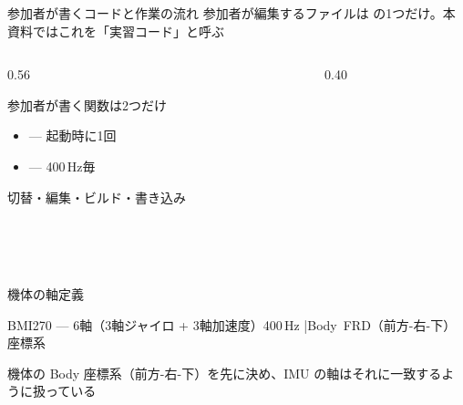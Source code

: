 \begin{frame}[fragile]{参加者が書くコードと作業の流れ}
  {\small 参加者が編集するファイルは  の1つだけ。本資料ではこれを「実習コード」と呼ぶ}
  \vspace{0.2em}
  \begin{columns}[T]
    \begin{column}{0.56\textwidth}
      \begin{block}{参加者が書く関数は2つだけ}
        \footnotesize
        \begin{itemize}
          \item {} --- 起動時に1回
          \item {} --- 400\,Hz毎
        \end{itemize}
      \end{block}
      \vspace{0.3em}
      \begin{exampleblock}{切替・編集・ビルド・書き込み}
        \footnotesize
        \\
        \\
        \\
        \\
      \end{exampleblock}
    \end{column}
    \begin{column}{0.40\textwidth}
      \centering
    \end{column}
  \end{columns}
\end{frame}

\begin{frame}{機体の軸定義}
  \vspace{-0.5em}
  \begin{center}
  \end{center}
  \vspace{-0.5em}
  \begin{block}{}
    \centering\small
    BMI270 --- 6軸（3軸ジャイロ + 3軸加速度）400\,Hz \quad|\quad \mbox{Body FRD（前方-右-下）座標系}
  \end{block}
  {\footnotesize 機体の Body 座標系（前方-右-下）を先に決め、IMU の軸はそれに一致するように扱っている}
\end{frame}

